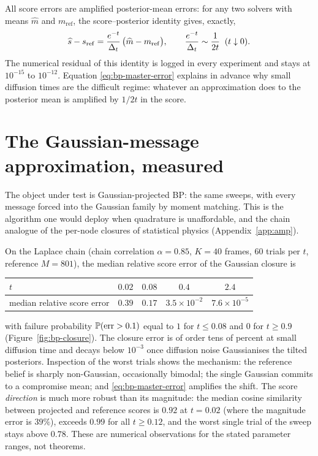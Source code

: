 All score errors are amplified posterior-mean errors: for any two solvers
with means $\widehat m$ and $m_{\mathrm{ref}}$, the score--posterior
identity gives, exactly,
\begin{equation}
  \widehat s - s_{\mathrm{ref}}
  = \frac{e^{-t}}{\Delta_t}\,
    \big( \widehat m - m_{\mathrm{ref}} \big),
  \qquad
  \frac{e^{-t}}{\Delta_t} \sim \frac{1}{2t} \;\; (t \downarrow 0).
  \label{eq:bp-master-error}
\end{equation}
The numerical residual of this identity is logged in every experiment and
stays at $10^{-15}$ to $10^{-12}$. Equation \eqref{eq:bp-master-error}
explains in advance why small diffusion times are the difficult regime:
whatever an approximation does to the posterior mean is amplified by
$1/2t$ in the score.

\section{The Gaussian-message approximation, measured}\label{sec:l-closure}

The object under test is Gaussian-projected BP: the same sweeps, with
every message forced into the Gaussian family by moment matching. This is
the algorithm one would deploy when quadrature is unaffordable, and the
chain analogue of the per-node closures of statistical physics
(Appendix~\ref{app:amp}).

On the Laplace chain (chain correlation $\alpha = 0.85$, $K = 40$ frames, $60$ trials per
$t$, reference $M = 801$), the median relative score error of the
Gaussian closure is
\begin{center}
\begin{tabular}{@{}lcccc@{}}
\toprule
$t$ & $0.02$ & $0.08$ & $0.4$ & $2.4$ \\
\midrule
median relative score error & $0.39$ & $0.17$ & $3.5 \times 10^{-2}$
& $7.6 \times 10^{-5}$ \\
\bottomrule
\end{tabular}
\end{center}
with failure probability $\mathbb{P}(\mathrm{err} > 0.1)$ equal to $1$ for
$t \leq 0.08$ and $0$ for $t \geq 0.9$ (Figure~\ref{fig:bp-closure}). The
closure error is of order tens of percent at small diffusion time and
decays below $10^{-3}$ once diffusion noise Gaussianises the tilted
posteriors. Inspection of the worst trials shows the mechanism: the
reference belief is sharply non-Gaussian, occasionally bimodal; the
single Gaussian commits to a compromise mean; and
\eqref{eq:bp-master-error} amplifies the shift. The score
\emph{direction} is much more robust than its magnitude: the median
cosine similarity between projected and reference scores is $0.92$ at
$t = 0.02$ (where the magnitude error is $39\%$), exceeds $0.99$ for all
$t \geq 0.12$, and the worst single trial of the sweep stays above
$0.78$. These are numerical observations for the stated parameter ranges,
not theorems.

